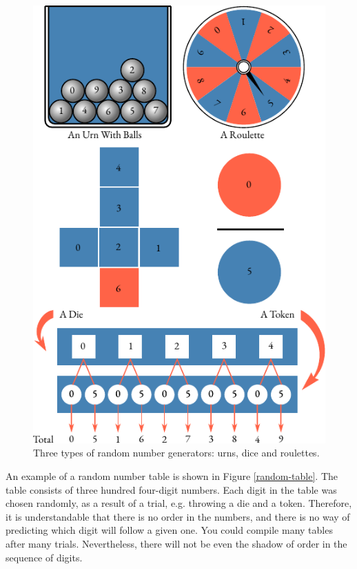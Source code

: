\begin{figure}[!ht]
 \centering
 \includegraphics[width=0.82\tfwidth]{figures/random-generators.pdf}
\caption{Three types of random number generators: urns, dice and roulettes.
\label{random-generators}}
 \end{figure}
{} An example of a random number table is
shown in Figure \ref{random-table}. The table consists of three hundred four-digit
numbers. Each digit in the table was chosen randomly, as a result of
a trial, e.g. throwing a die and a token. Therefore, it is understandable
that there is no order in the numbers, and there is no way of predicting
which digit will follow a given one. You could compile many tables after
many trials. Nevertheless, there will not be even the shadow of order in
the sequence of digits.

